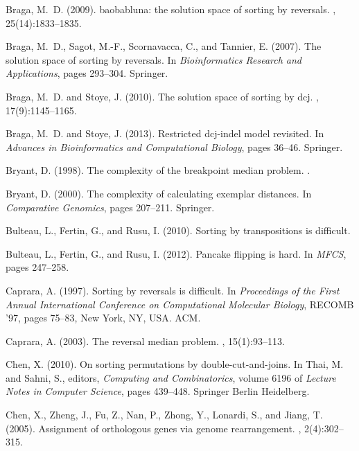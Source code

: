 \documentclass[11pt,final,twoside,nofrench]{thlifl}
\begin{document}
{\begin{thebibliography}{}
Braga, M.~D. (2009).
\newblock baobabluna: the solution space of sorting by reversals.
, 25(14):1833--1835.

Braga, M.~D., Sagot, M.-F., Scornavacca, C., and Tannier, E. (2007).
\newblock The solution space of sorting by reversals.
\newblock In {\em Bioinformatics Research and Applications}, pages 293--304.
  Springer.

Braga, M.~D. and Stoye, J. (2010).
\newblock The solution space of sorting by dcj.
, 17(9):1145--1165.

Braga, M.~D. and Stoye, J. (2013).
\newblock Restricted dcj-indel model revisited.
\newblock In {\em Advances in Bioinformatics and Computational Biology}, pages
  36--46. Springer.

Bryant, D. (1998).
\newblock The complexity of the breakpoint median problem.
.

Bryant, D. (2000).
\newblock The complexity of calculating exemplar distances.
\newblock In {\em Comparative Genomics}, pages 207--211. Springer.

Bulteau, L., Fertin, G., and Rusu, I. (2010).
\newblock Sorting by transpositions is difficult.

Bulteau, L., Fertin, G., and Rusu, I. (2012).
\newblock Pancake flipping is hard.
\newblock In {\em MFCS}, pages 247--258.

Caprara, A. (1997).
\newblock Sorting by reversals is difficult.
\newblock In {\em Proceedings of the First Annual International Conference on
  Computational Molecular Biology}, RECOMB '97, pages 75--83, New York, NY,
  USA. ACM.

Caprara, A. (2003).
\newblock The reversal median problem.
, 15(1):93--113.

Chen, X. (2010).
\newblock On sorting permutations by double-cut-and-joins.
\newblock In Thai, M. and Sahni, S., editors, {\em Computing and
  Combinatorics}, volume 6196 of {\em Lecture Notes in Computer Science}, pages
  439--448. Springer Berlin Heidelberg.

Chen, X., Zheng, J., Fu, Z., Nan, P., Zhong, Y., Lonardi, S., and Jiang, T.
  (2005).
\newblock Assignment of orthologous genes via genome rearrangement.
, 2(4):302--315.


\end{thebibliography}}
\end{document}
